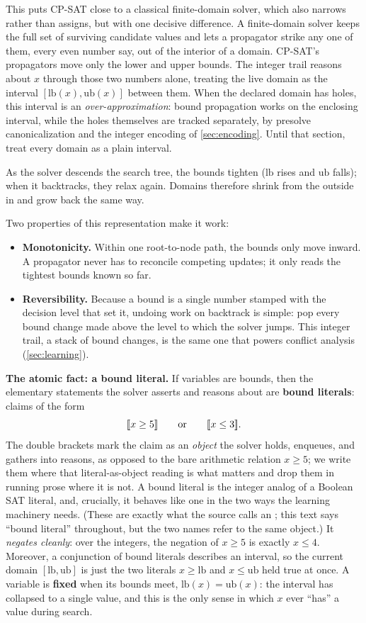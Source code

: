 This puts CP-SAT close to a classical finite-domain solver, which also narrows
rather than assigns, but with one decisive difference. A finite-domain solver
keeps the full set of surviving candidate values and lets a propagator strike any
one of them, every even number say, out of the interior of a domain. CP-SAT's
propagators move only the lower and upper bounds. The integer trail reasons about
$x$ through those two numbers alone, treating the live domain as the interval
$[\text{lb}(x), \text{ub}(x)]$ between them. When the declared domain has holes,
this interval is an \emph{over-approximation}: bound propagation works on the
enclosing interval, while the holes themselves are tracked separately, by presolve
canonicalization and the integer encoding of \cref{sec:encoding}. Until that
section, treat every domain as a plain interval.

As the solver descends the search tree, the bounds tighten ($\text{lb}$ rises and
$\text{ub}$ falls); when it backtracks, they relax again. Domains therefore shrink
from the outside in and grow back the same way.

Two properties of this representation make it work:

\begin{itemize}
  \item \textbf{Monotonicity.} Within one root-to-node path, the bounds only move
  inward. A propagator never has to reconcile competing updates; it only reads
  the tightest bounds known so far.
  \item \textbf{Reversibility.} Because a bound is a single number stamped with
  the decision level that set it, undoing work on backtrack is simple: pop every
  bound change made above the level to which the solver jumps. This integer
  trail, a stack of bound changes, is the same one that powers conflict analysis
  (\cref{sec:learning}).
\end{itemize}

\textbf{The atomic fact: a bound literal.} If variables are bounds, then the
elementary statements the solver asserts and reasons about are \textbf{bound
literals}: claims of the form
\[
  [\![x \ge 5]\!] \qquad\text{or}\qquad [\![x \le 3]\!] .
\]
The double brackets mark the claim as an \emph{object} the solver holds,
enqueues, and gathers into reasons, as opposed to the bare arithmetic relation
$x \ge 5$; we write them where that literal-as-object reading is what matters and
drop them in running prose where it is not. A bound literal is the integer analog
of a Boolean SAT literal, and, crucially, it behaves like one in the two ways the
learning machinery needs. (These are
exactly what the source calls an ; this text says ``bound
literal'' throughout, but the two names refer to the same object.) It
\emph{negates cleanly}: over the integers, the negation of $x \ge 5$ is exactly
$x \le 4$. Moreover, a conjunction of bound literals describes an interval, so
the current domain $[\text{lb},\text{ub}]$ is just the two literals
$x \ge \text{lb}$ and $x \le \text{ub}$ held true at once. A variable is
\textbf{fixed} when its bounds meet, $\text{lb}(x) = \text{ub}(x)$: the interval
has collapsed to a single value, and this is the only sense in which $x$ ever
``has'' a value during search.

